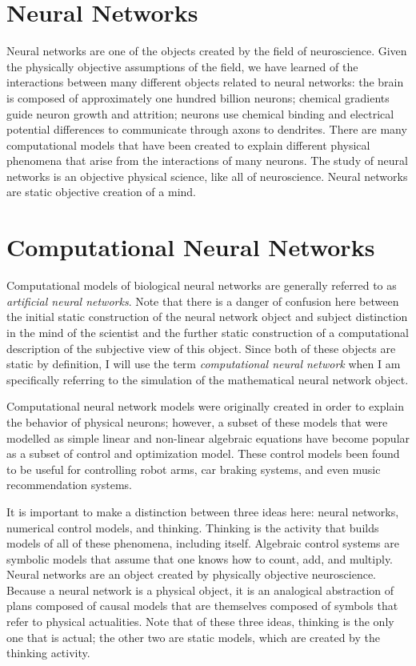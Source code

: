 \section{Neural Networks}

Neural networks are one of the objects created by the field of
neuroscience.  Given the physically objective assumptions of the
field, we have learned of the interactions between many different
objects related to neural networks: the brain is composed of
approximately one hundred billion neurons; chemical gradients guide
neuron growth and attrition; neurons use chemical binding and
electrical potential differences to communicate through axons to
dendrites.  There are many computational models that have been created
to explain different physical phenomena that arise from the
interactions of many neurons.  The study of neural networks is an
objective physical science, like all of neuroscience.  Neural networks
are static objective creation of a mind.

\section{Computational Neural Networks}

Computational models of biological neural networks are generally
referred to as \emph{artificial neural networks}.  Note that there is
a danger of confusion here between the initial static construction of
the neural network object and subject distinction in the mind of the
scientist and the further static construction of a computational
description of the subjective view of this object.  Since both of
these objects are static by definition, I will use the term
\emph{computational neural network} when I am specifically referring
to the simulation of the mathematical neural network object.

Computational neural network models were originally created in order
to explain the behavior of physical neurons; however, a subset of
these models that were modelled as simple linear and non-linear
algebraic equations have become popular as a subset of control and
optimization model.  These control models been found to be useful for
controlling robot arms, car braking systems, and even music
recommendation systems.

It is important to make a distinction between three ideas here: neural
networks, numerical control models, and thinking.  Thinking is the
activity that builds models of all of these phenomena, including
itself.  Algebraic control systems are symbolic models that assume
that one knows how to count, add, and multiply.  Neural networks are
an object created by physically objective neuroscience.  Because a
neural network is a physical object, it is an analogical abstraction
of plans composed of causal models that are themselves composed of
symbols that refer to physical actualities.  Note that of these three
ideas, thinking is the only one that is actual; the other two are
static models, which are created by the thinking activity.

